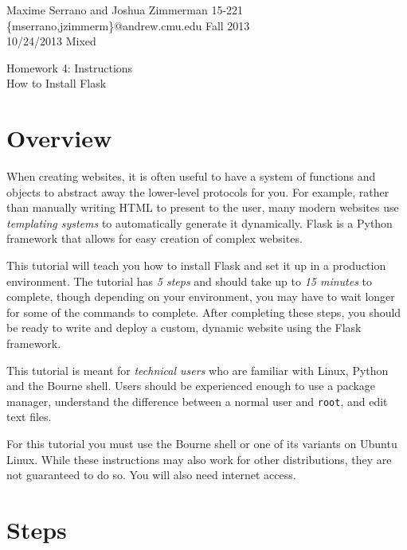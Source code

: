 \documentclass{article}
\title{} \date{}
\begin{document}
\noindent Maxime Serrano and Joshua Zimmerman \hfill 15-221 \\
\{mserrano,jzimmerm\}@andrew.cmu.edu \hfill Fall 2013 \\
10/24/2013 \hfill Mixed \\
\begin{center}
Homework 4: Instructions \\
\vspace{10 mm}
{\huge How to Install Flask}
\end{center}
\pagebreak

\section{Overview}
When creating websites, it is often useful to have a system of functions and objects
to abstract away the lower-level protocols for you. For example, rather than manually
writing HTML to present to the user, many modern websites use {\em templating systems}
to automatically generate it dynamically. Flask is a Python framework that allows
for easy creation of complex websites.

This tutorial will teach you how to install Flask and set it up in a production environment.
The tutorial has {\em 5 steps} and should take up to {\em 15 minutes} to complete, though
depending on your environment, you may have to wait longer for some of the commands to complete.
After completing these steps, you should be ready to write and deploy a custom, dynamic
website using the Flask framework.

This tutorial is meant for {\em technical users} who are familiar with Linux, Python and
the Bourne shell. Users should be experienced enough to use a package manager, understand
the difference between a normal user and \texttt{root}, and edit text files.

For this tutorial you must use the Bourne shell or one of its variants on Ubuntu Linux.
While these instructions may also work for other distributions, they are not guaranteed
to do so. You will also need internet access.

\pagebreak

\section{Steps}
\end{document}
